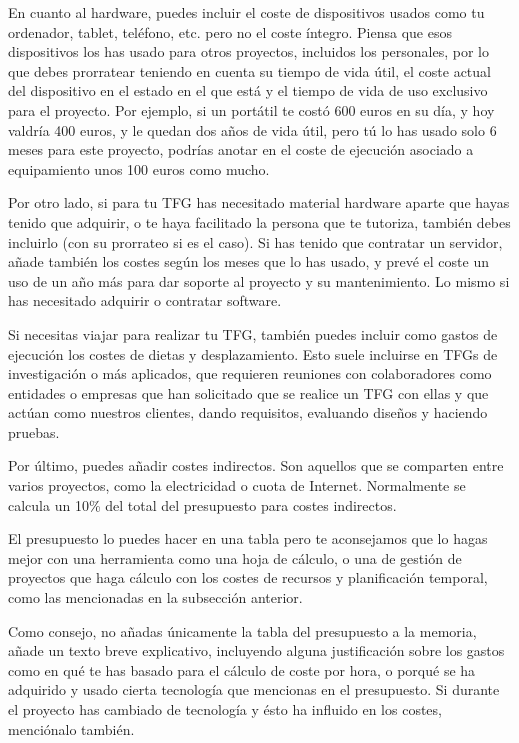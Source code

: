 En cuanto al hardware, puedes incluir el coste de dispositivos usados como tu ordenador, tablet, teléfono, etc. pero no el coste íntegro. Piensa que esos dispositivos los has usado para otros proyectos, incluidos los personales, por lo que debes prorratear teniendo en cuenta su tiempo de vida útil, el coste actual del dispositivo en el estado en el que está y el tiempo de vida de uso exclusivo para el proyecto. Por ejemplo, si un portátil te costó 600 euros en su día, y hoy valdría 400 euros, y le quedan dos años de vida útil, pero tú lo has usado solo 6 meses para este proyecto, podrías anotar en el coste de ejecución asociado a equipamiento unos 100 euros como mucho.  

Por otro lado, si para tu TFG has necesitado material hardware aparte que hayas tenido que adquirir, o te haya facilitado la persona que te tutoriza, también debes incluirlo (con su prorrateo si es el caso). Si has tenido que contratar un servidor, añade también los costes según los meses que lo has usado, y prevé el coste un uso de un año más para dar soporte al proyecto y su mantenimiento. Lo mismo si has necesitado adquirir o contratar software.

Si necesitas viajar para realizar tu TFG, también puedes incluir como gastos de ejecución los costes de dietas y desplazamiento. Esto suele incluirse en TFGs de investigación o más aplicados, que requieren reuniones con colaboradores como entidades o empresas que han solicitado que se realice un TFG con ellas y que actúan como nuestros clientes, dando requisitos, evaluando diseños y haciendo pruebas. 

Por último, puedes añadir costes indirectos. Son aquellos que se comparten entre varios proyectos, como la electricidad o cuota de Internet. Normalmente se calcula un 10\% del total del presupuesto para costes indirectos.

El presupuesto lo puedes hacer en una tabla pero te aconsejamos que lo hagas mejor con una herramienta como una hoja de cálculo, o una de gestión de proyectos que haga cálculo con los costes de recursos y planificación temporal, como las mencionadas en la subsección anterior.

Como consejo, no añadas únicamente la tabla del presupuesto a la memoria, añade un texto breve explicativo, incluyendo alguna justificación sobre los gastos como en qué te has basado para el cálculo de coste por hora, o porqué se ha adquirido y usado cierta tecnología que mencionas en el presupuesto. Si durante el proyecto has cambiado de tecnología y ésto ha influido en los costes, menciónalo también.

